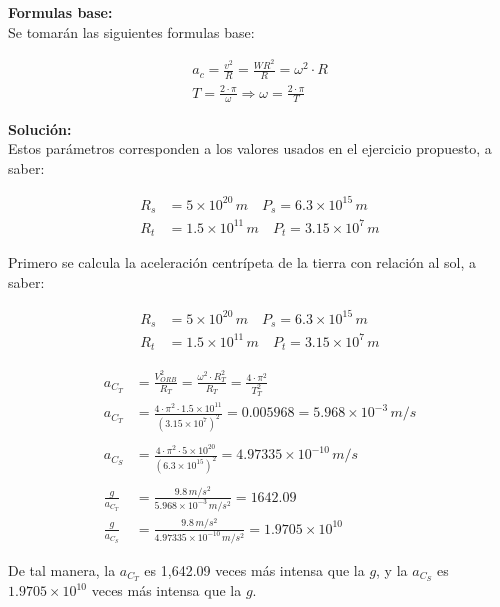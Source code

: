 \documentclass[11pt,letterpaper]{article}
\begin{document}
\textbf{Formulas base:}\\

Se tomarán las siguientes formulas base:

\begin{align}
\boxed{ a_{c} = \frac{v^2}{R} = \frac{{WR}^2}{R} = {\omega}^2 \cdot R}\\
\boxed{ T = \frac{2 \cdot \pi}{\omega} \Rightarrow \omega = \frac{2 \cdot \pi}{T}}
\end{align}

\textbf{Solución:}\\

Estos parámetros corresponden a los valores usados en el ejercicio propuesto, a saber:

\begin{align*}
R_{s} &= 5 \times {10}^20\,m \quad P_{s} = 6.3 \times {10}^15\,m\\
R_{t} &= 1.5 \times {10}^11\,m \quad P_{t} = 3.15 \times {10}^7\,m
\end{align*}

Primero se calcula la aceleración centrípeta de la tierra con relación al sol, a saber:

\begin{align*}
R_{s} &= 5 \times {10}^20\,m \quad P_{s} = 6.3 \times {10}^15\,m\\
R_{t} &= 1.5 \times {10}^11\,m \quad P_{t} = 3.15 \times {10}^7\,m
\end{align*}

\begin{align*}
a_{C_{T}} &= \frac{V_{ORB}^2}{R_{T}} = \frac{\omega^2 \cdot R_{T}^2}{R_{T}} = \frac{4 \cdot \pi^2}{T_{T}^2}\\
a_{C_{T}} &= \frac{4 \cdot \pi^2 \cdot 1.5 \times 10^{11}}{(3.15 \times 10^{7})^2} = 0.005968 = 5.968 \times 10^{-3}\,m/s\\
\,\\
a_{C_{S}} &= \frac{4 \cdot \pi^2 \cdot 5 \times 10^{20}}{(6.3 \times 10^{15})^2} = 4.97335 \times 10^{-10}\,m/s\\
\,\\
\frac{g}{a_{C_{T}}} &= \frac{9.8\,m/s^2}{5.968 \times 10^{-3}\,m/s^2} = 1642.09\\
\frac{g}{a_{C_{S}}} &= \frac{9.8\,m/s^2}{4.97335 \times 10^{-10}\,m/s^2} = 1.9705 \times 10^{10}
\end{align*}

De tal manera, la $a_{C_{T}}$ es 1,642.09 veces más intensa que la $g$, y la $a_{C_{S}}$ es $1.9705 \times 10^{10}$ veces más intensa que la $g$.

\end{document}

